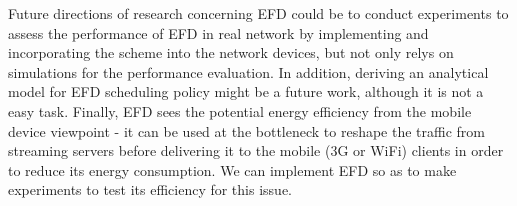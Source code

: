 \documentclass[preprint,12pt]{elsarticle}
\begin{document}
Future directions of research concerning EFD could be to conduct experiments to assess the performance of EFD in real network by implementing and incorporating the scheme into the network devices, but not only relys on simulations for the performance evaluation. In addition, deriving an analytical model for EFD scheduling policy might be a future work, although it is not a easy task. Finally, EFD sees the potential energy efficiency from the mobile device viewpoint - it can be used at the bottleneck to reshape the traffic from streaming servers before delivering it to the mobile (3G or WiFi) clients in order to reduce its energy consumption. We can implement EFD so as to make experiments to test its efficiency for this issue. 














\end{document}
